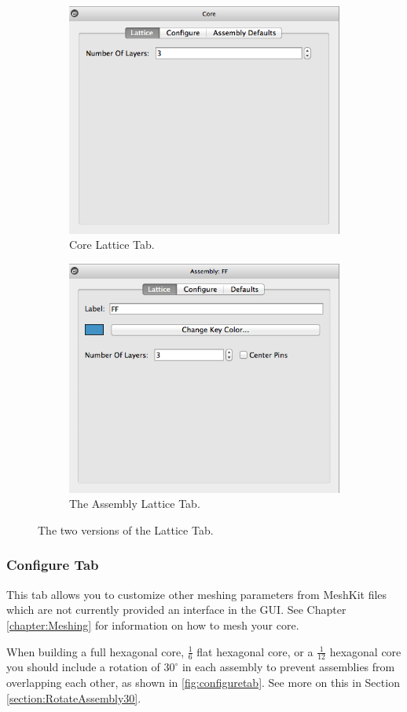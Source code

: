\begin{figure}
\centering
\begin{subfigure}{.5\textwidth}
  \centering
  \includegraphics[width=0.6\linewidth]{Images/core-lattice.png}
  \caption{Core Lattice Tab.}
  \label{fig:rectSetMaterial}
\end{subfigure}%
\begin{subfigure}{.5\textwidth}
  \centering
  \includegraphics[width=0.6\linewidth]{Images/assy-lattice.png}
  \caption{The Assembly Lattice Tab.}
  \label{fig:rectDuctResult}
\end{subfigure}
\caption{The two versions of the Lattice Tab.}
\label{fig:latticetab}
\end{figure}


\subsubsection{Configure Tab}
This tab allows you to customize other meshing parameters from MeshKit files which are not currently provided an interface in the GUI. See Chapter \ref{chapter:Meshing} for information on how to mesh your core.

When building a full hexagonal core, $\frac{1}{6}$ flat hexagonal core, or a $\frac{1}{12}$ hexagonal core you should include a rotation of $30^\circ$ in each assembly to prevent assemblies from overlapping each other, as shown in \ref{fig:configuretab}.  See more on this in Section \ref{section:RotateAssembly30}.

